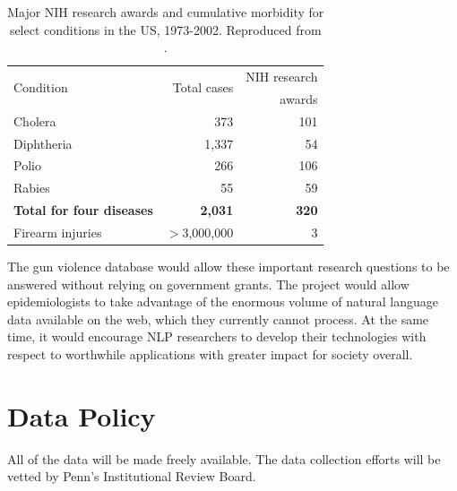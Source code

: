 \documentclass[11pt]{article}
\begin{document}
\begin{table}
\centering
\footnotesize
\begin{tabular}{lrr}
\hline\hline
\multirow{2}{*}{Condition} & \multirow{2}{*}{Total cases} & \multirow{1}{*}{NIH research}\\
&& \multirow{1}{*}{awards}\\\hline
Cholera & 373 & 101 \\
Diphtheria & 1,337 & 54 \\
Polio & 266 & 106 \\
Rabies & 55 & 59 \\
\textbf{Total for four diseases} & \textbf{2,031} & \textbf{320} \\
Firearm injuries & $>$3,000,000 & 3 \\
\hline\hline
\end{tabular}
\caption{Major NIH research awards and cumulative morbidity for select conditions in the US, 1973-2002. Reproduced from .}
\label{nih}
\end{table}

The gun violence database would allow these important research questions to be answered without relying on government grants. The project would allow epidemiologists to take advantage of the enormous volume of natural language data available on the web, which they currently cannot process. At the same time, it would encourage NLP researchers to develop their technologies with respect to worthwhile applications with greater impact for society overall. 


\section{Data Policy}

All of the data will be made freely available.  The data collection efforts will be vetted by Penn's Institutional Review Board.  


\end{document}
